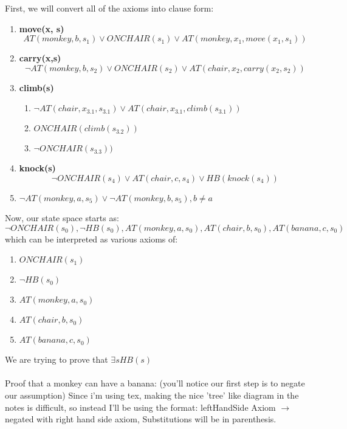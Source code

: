 \documentclass[11pt]{article}
\begin{document}
First, we will convert all of the axioms into clause form: 
\begin{enumerate}[(1)]
\item \textbf{move(x, s)} \\
$$AT(monkey, b, s_1) \vee ONCHAIR(s_1) \vee AT(monkey, x_1, move(x_1, s_1))$$
\item \textbf{carry(x,s)}\\
$$\neg AT(monkey, b, s_2) \vee ONCHAIR(s_2) \vee AT(chair, x_2, carry(x_2, s_2))$$
\item \textbf{climb(s)}\\
\begin{enumerate}[(3.1)]
\item $\neg AT(chair, x_{3.1}, s_{3.1}) \vee AT(chair, x_{3.1}, climb(s_{3.1}))$
\item $ ONCHAIR(climb(s_{3.2}))$
\item $\neg ONCHAIR(s_{3.3}))$
\end{enumerate}
\item \textbf{knock(s)}\\
$$ \neg ONCHAIR(s_4) \vee AT(chair, c, s_4) \vee HB(knock(s_4))$$
\item $\neg AT(monkey, a, s_5) \vee \neg AT(monkey, b, s_5), b \not = a$
\end{enumerate}
Now, our state space starts as: 
$$\neg ONCHAIR(s_0), \neg HB(s_0), AT(monkey, a, s_0), AT(chair, b, s_0), AT(banana, c, s_0)$$
which can be interpreted as various axioms of: 
\begin{enumerate}[(6.1)]
\item $ONCHAIR(s_1)$
\item $\neg HB(s_0)$
\item $AT(monkey, a, s_0)$
\item $AT(chair, b, s_0)$
\item $AT(banana, c, s_0)$
\end{enumerate}
We are trying to prove that $\exists s HB(s)$\\\\
Proof that a monkey can have a banana:  (you'll notice our first step is to negate our assumption)
Since i'm using tex, making the nice 'tree' like diagram in the notes is difficult, so instead I'll be using the format: leftHandSide Axiom $\rightarrow$ negated with right hand side axiom, Substitutions will be in parenthesis. \\
\end{document}
